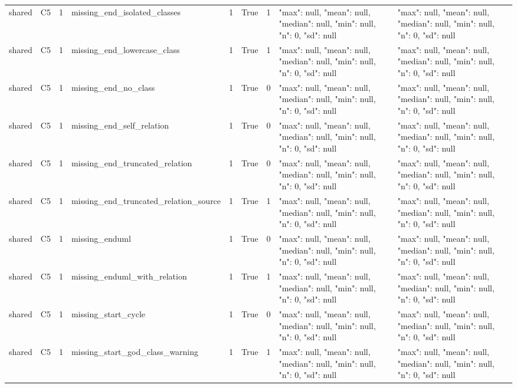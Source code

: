 \begin{tabular}{lllllllll}
shared & C5 & 1 & missing\_end\_isolated\_classes & 1 & True & 1 & {"max": null, "mean": null, "median": null, "min": null, "n": 0, "sd": null} & {"max": null, "mean": null, "median": null, "min": null, "n": 0, "sd": null} \\
shared & C5 & 1 & missing\_end\_lowercase\_class & 1 & True & 1 & {"max": null, "mean": null, "median": null, "min": null, "n": 0, "sd": null} & {"max": null, "mean": null, "median": null, "min": null, "n": 0, "sd": null} \\
shared & C5 & 1 & missing\_end\_no\_class & 1 & True & 0 & {"max": null, "mean": null, "median": null, "min": null, "n": 0, "sd": null} & {"max": null, "mean": null, "median": null, "min": null, "n": 0, "sd": null} \\
shared & C5 & 1 & missing\_end\_self\_relation & 1 & True & 0 & {"max": null, "mean": null, "median": null, "min": null, "n": 0, "sd": null} & {"max": null, "mean": null, "median": null, "min": null, "n": 0, "sd": null} \\
shared & C5 & 1 & missing\_end\_truncated\_relation & 1 & True & 0 & {"max": null, "mean": null, "median": null, "min": null, "n": 0, "sd": null} & {"max": null, "mean": null, "median": null, "min": null, "n": 0, "sd": null} \\
shared & C5 & 1 & missing\_end\_truncated\_relation\_source & 1 & True & 1 & {"max": null, "mean": null, "median": null, "min": null, "n": 0, "sd": null} & {"max": null, "mean": null, "median": null, "min": null, "n": 0, "sd": null} \\
shared & C5 & 1 & missing\_enduml & 1 & True & 0 & {"max": null, "mean": null, "median": null, "min": null, "n": 0, "sd": null} & {"max": null, "mean": null, "median": null, "min": null, "n": 0, "sd": null} \\
shared & C5 & 1 & missing\_enduml\_with\_relation & 1 & True & 1 & {"max": null, "mean": null, "median": null, "min": null, "n": 0, "sd": null} & {"max": null, "mean": null, "median": null, "min": null, "n": 0, "sd": null} \\
shared & C5 & 1 & missing\_start\_cycle & 1 & True & 0 & {"max": null, "mean": null, "median": null, "min": null, "n": 0, "sd": null} & {"max": null, "mean": null, "median": null, "min": null, "n": 0, "sd": null} \\
shared & C5 & 1 & missing\_start\_god\_class\_warning & 1 & True & 1 & {"max": null, "mean": null, "median": null, "min": null, "n": 0, "sd": null} & {"max": null, "mean": null, "median": null, "min": null, "n": 0, "sd": null} \\

\end{tabular}
